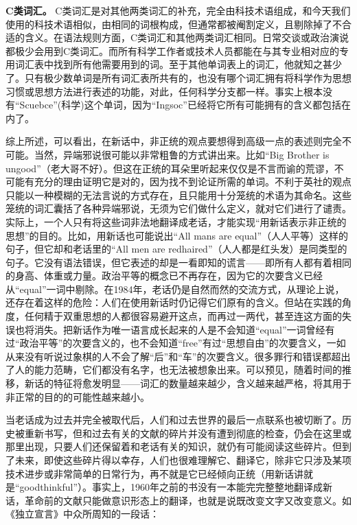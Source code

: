\sectionbreak

\textbf{C类词汇。} C类词汇是对其他两类词汇的补充，完全由科技术语组成，和今天我们使用的科技术语相似，由相同的词根构成，但通常都被阉割定义，且剔除掉了不合适的含义。在语法规则方面，C类词汇和其他两类词汇相同。日常交谈或政治演说都极少会用到C类词汇。而所有科学工作者或技术人员都能在与其专业相对应的专用词汇表中找到所有他需要用到的词。至于其他单词表上的词汇，他就知之甚少了。只有极少数单词是所有词汇表所共有的，也没有哪个词汇拥有将科学作为思想习惯或思想方法进行表述的功能，对此，任何科学分支都一样。事实上根本没有``Scuebce''(科学)这个单词，因为``Ingsoc''已经将它所有可能拥有的含义都包括在内了。

\sectionbreak

综上所述，可以看出，在新话中，非正统的观点要想得到高级一点的表述则完全不可能。当然，异端邪说很可能以非常粗鲁的方式讲出来。比如``Big
Brother is
ungood''（老大哥不好）。但这在正统的耳朵里听起来仅仅是不言而谕的荒谬，不可能有充分的理由证明它是对的，因为找不到论证所需的单词。不利于英社的观点只能以一种模糊的无法言说的方式存在，且只能用十分笼统的术语为其命名。这些笼统的词汇囊括了各种异端邪说，无须为它们做什么定义，就对它们进行了谴责。实际上，一个人只有将这些词非法地翻译成老话，才能实现``用新话表示非正统的思想''的目的。比如，用新话也可能说出``All
mans are equal''（人人平等）这样的句子，但它却和老话里的``All men are
redhaired''（人人都是红头发）是同类型的句子。它没有语法错误，但它表述的却是一看即知的谎言——即所有人都有着相同的身高、体重或力量。政治平等的概念已不再存在，因为它的次要含义已经从``equal''一词中剔除。在1984年，老话仍是自然而然的交流方式，从理论上说，还存在着这样的危险：人们在使用新话时仍记得它们原有的含义。但站在实践的角度，任何精于双重思想的人都很容易避开这点，而再过一两代，甚至连这方面的失误也将消失。把新话作为唯一语言成长起来的人是不会知道``equal''一词曾经有过``政治平等''的次要含义的，也不会知道``free''有过``思想自由''的次要含义，一如从来没有听说过象棋的人不会了解``后''和``车''的次要含义。很多罪行和错误都超出了人的能力范畴，它们都没有名字，也无法被想象出来。可以预见，随着时间的推移，新话的特征将愈发明显——词汇的数量越来越少，含义越来越严格，将其用于非正常的目的的可能性越来越小。

当老话成为过去并完全被取代后，人们和过去世界的最后一点联系也被切断了。历史被重新书写，但和过去有关的文献的碎片并没有遭到彻底的检查，仍会在这里或那里出现，只要人们还保留着和老话有关的知识，就仍有可能阅读这些碎片。但到了未来，即使这些碎片得以幸存，人们也很难理解它、翻译它，除非它只涉及某项技术进步或非常简单的日常行为，再不就是它已经倾向正统（用新话讲就是``goodthinkful''）。事实上，1960年之前的书没有一本能完完整整地翻译成新话，革命前的文献只能做意识形态上的翻译，也就是说既改变文字又改变意义。如《独立宣言》中众所周知的一段话：

